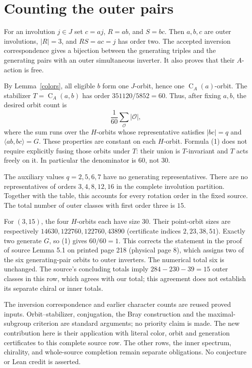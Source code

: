 \documentclass[11pt,a4paper]{article}
\newcommand{\C}{\operatorname{C}}
\begin{document}
\section{Counting the outer pairs}
For an involution $j\in J$ set $c=aj$, $R=ab$, and $S=bc$.
Then $a,b,c$ are outer involutions, $|R|=3$, and $RS=ac=j$ has
order two. The accepted inversion correspondence gives a bijection
between the generating triples and the generating pairs with an outer
simultaneous inverter. It also proves that their $A$-action is free.

By Lemma~\ref{colors}, all eligible $b$ form one $J$-orbit, hence one
$\C_A(a)$-orbit. The stabilizer $T=\C_A(a,b)$ has order
$351120/5852=60$. Thus, after fixing $a,b$, the desired orbit count is
\[
 \frac1{60}\sum_{\mathcal O}|\mathcal O|,
 \tag{1}
\]
where the sum runs over the $H$-orbits whose representative satisfies
$|bc|=q$ and $\langle ab,bc\rangle=G$. These properties are constant
on each $H$-orbit. Formula (1) does not require explicitly fusing those
orbits under $T$: their union is $T$-invariant and $T$ acts freely on
it. In particular the denominator is $60$, not $30$.



The auxiliary values $q=2,5,6,7$ have no generating representatives.
There are no representatives of orders $3,4,8,12,16$ in the complete
involution partition. Together with the table, this accounts for every
rotation order in the fixed source. The total number of outer classes
with first order three is $15$.

For $(3,15)$, the four $H$-orbits each have size $30$. Their point-orbit
sizes are respectively $14630,122760,122760,43890$ (certificate indices
$2,23,38,51$). Exactly two generate $G$, so (1) gives $60/60=1$.
This corrects the statement in the proof of source Lemma 5.1 on printed
page 218 (physical page 8), which assigns two of the six generating-pair
orbits to outer inverters. The numerical total six is unchanged.
The source's concluding totals imply $284-230-39=15$ outer classes in
this row, which agrees with our total; this agreement does not establish
its separate chiral or inner totals.

The inversion correspondence and earlier character counts are reused
proved inputs. Orbit--stabilizer, conjugation, the Bray construction and
the maximal-subgroup criterion are standard arguments; no priority claim
is made. The new contribution here is their application with literal
color, orbit and generation certificates to this complete source row.
The other rows, the inner spectrum, chirality, and whole-source completion
remain separate obligations. No conjecture or Lean credit is asserted.
\end{document}
